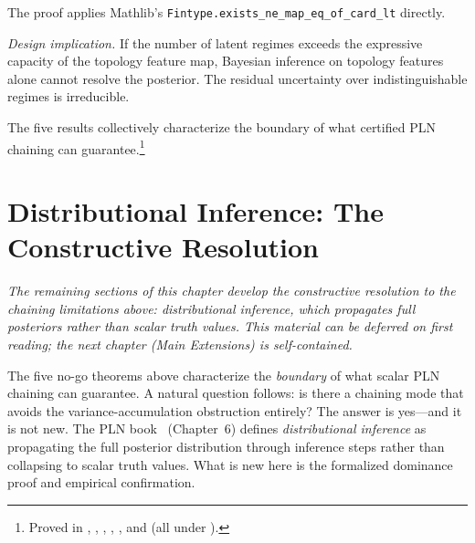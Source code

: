 \documentclass[11pt,openany]{report}
\begin{document}
The proof applies Mathlib's \texttt{Fintype.exists\_ne\_map\_eq\_of\_card\_lt}
directly.

\textit{Design implication.}  If the number of latent regimes exceeds the
expressive capacity of the topology feature map, Bayesian inference on
topology features alone cannot resolve the posterior.  The residual
uncertainty over indistinguishable regimes is irreducible.

\medskip
The five results collectively characterize the boundary of what certified
PLN chaining can guarantee.\footnote{%
  Proved in
  ,
  ,
  ,
  ,
  ,
  and 
  (all under ).}


\section{Distributional Inference: The Constructive Resolution}
\label{sec:distributional-inference}

\emph{The remaining sections of this chapter develop the constructive
resolution to the chaining limitations above: distributional inference,
which propagates full posteriors rather than scalar truth values.  This
material can be deferred on first reading; the next chapter (Main
Extensions) is self-contained.}

\medskip
The five no-go theorems above characterize the \emph{boundary} of what scalar
PLN chaining can guarantee.  A natural question follows: is there a chaining
mode that avoids the variance-accumulation obstruction entirely?  The answer
is yes---and it is not new.  The PLN book~\cite{goertzel2009pln} (Chapter~6)
defines \emph{distributional inference} as propagating the full posterior
distribution through inference steps rather than collapsing to scalar truth
values.  What is new here is the formalized dominance proof and empirical
confirmation.
\end{document}
